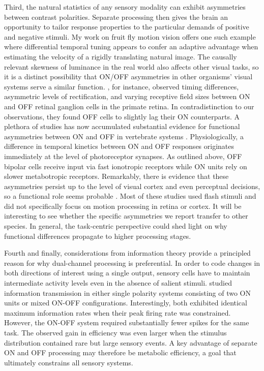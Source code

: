 Third, the natural statistics of any sensory modality can exhibit asymmetries between contrast polarities. Separate processing then gives the brain an opportunity to tailor response properties to the particular demands of positive and negative stimuli. My work on fruit fly motion vision offers one such example where differential temporal tuning appears to confer an adaptive advantage when estimating the velocity of a rigidly translating natural image. The causally relevant skewness of luminance in the real world also affects other visual tasks, so it is a distinct possibility that ON/OFF asymmetries in other organisms' visual systems serve a similar function. \citet{Chichilnisky:2002wu}, for instance, observed timing differences, asymmetric levels of rectification, and varying receptive field sizes between ON and OFF retinal ganglion cells in the primate retina. In contradistinction to our observations, they found OFF cells to slightly lag their ON counterparts. A plethora of studies has now accumulated substantial evidence for functional asymmetries between ON and OFF in vertebrate systems \citep{Copenhagen:1983aa,Zemon:1988aa,Zaghloul:2003aa,Gollisch:2008jv,Yeh:2009aa,Pandarinath:2010hg,Jin:2011aa,Burkhardt:2011aa}. Physiologically, a difference in temporal kinetics between ON and OFF responses originates immediately at the level of photoreceptor synapses. As outlined above, OFF bipolar cells receive input via fast ionotropic receptors while ON units rely on slower metabotropic receptors. Remarkably, there is evidence that these asymmetries persist up to the level of visual cortex and even perceptual decisions, so a functional role seems probable \citep{Komban:2014cq}. Most of these studies used flash stimuli and did not specifically focus on motion processing in retina or cortex. It will be interesting to see whether the specific asymmetries we report transfer to other species. In general, the task-centric perspective could shed light on why functional differences propagate to higher processing stages.

Fourth and finally, considerations from information theory provide a principled reason for why dual-channel processing is preferential. In order to code changes in both directions of interest using a single output, sensory cells have to maintain intermediate activity levels even in the absence of salient stimuli. \citet{Gjorgjieva:2014ks} studied information transmission in either single polarity systems consisting of two ON units or mixed ON-OFF configurations. Interestingly, both exhibited identical maximum information rates when their peak firing rate was constrained. However, the ON-OFF system required substantially fewer spikes for the same task. The observed gain in efficiency was even larger when the stimulus distribution contained rare but large sensory events. A key advantage of separate ON and OFF processing may therefore be metabolic efficiency, a goal that ultimately constrains all sensory systems.


